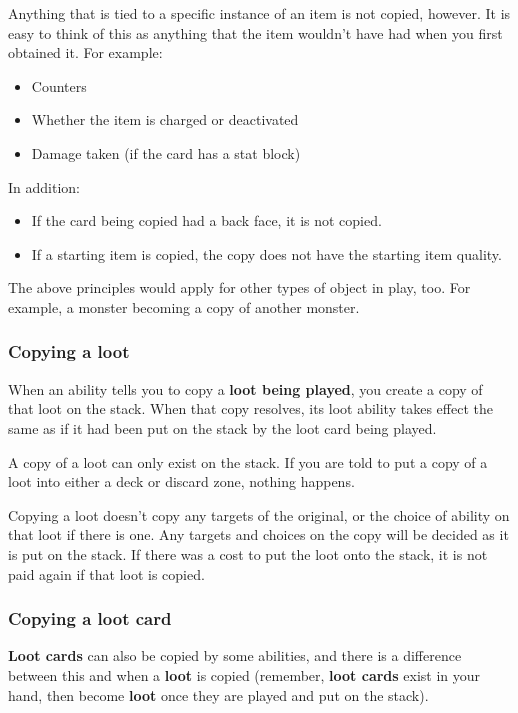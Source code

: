 \documentclass[10pt, a4paper, twoside]{article} %
\begin{document}
    Anything that is tied to a specific instance of an item is not copied, however. It is easy to think of this as anything that the item wouldn’t have had when you first obtained it. For example:

    \begin{itemize}
        \item Counters
        \item Whether the item is charged or deactivated
        \item Damage taken (if the card has a stat block)
    \end{itemize}

    In addition:

    \begin{itemize}
        \item If the card being copied had a back face, it is not copied.
        \item If a starting item is copied, the copy does not have the starting item quality.
    \end{itemize}

    The above principles would apply for other types of object in play, too. For example, a monster becoming a copy of another monster.
    \subsubsection*{Copying a loot}
    When an ability tells you to copy a \textbf{loot being played}, you create a copy of that loot on the stack. When that copy resolves, its loot ability takes effect the same as if it had been put on the stack by the loot card being played.

    A copy of a loot can only exist on the stack. If you are told to put a copy of a loot into either a deck or discard zone, nothing happens.

    Copying a loot doesn’t copy any targets of the original, or the choice of ability on that loot if there is one. Any targets and choices on the copy will be decided as it is put on the stack. If there was a cost to put the loot onto the stack, it is not paid again if that loot is copied.
    \subsubsection*{Copying a loot card}
    \textbf{Loot cards} can also be copied by some abilities, and there is a difference between this and when a \textbf{loot} is copied (remember, \textbf{loot cards} exist in your hand, then become \textbf{loot} once they are played and put on the stack).
\end{document}
